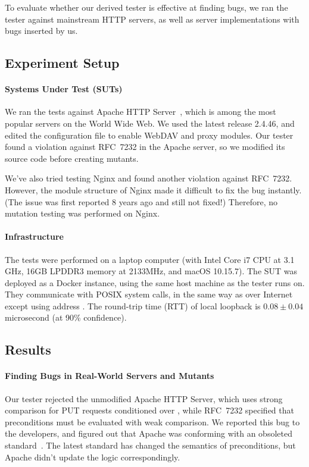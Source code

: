 To evaluate whether our derived tester is effective at finding bugs, we ran the
tester against mainstream HTTP servers, as well as server implementations with
bugs inserted by us.

\subsection{Experiment Setup}
\paragraph*{Systems Under Test (SUTs)}
We ran the tests against Apache HTTP Server~\cite{Apache}, which is among the
most popular servers on the World Wide Web.  We used the latest release 2.4.46,
and edited the configuration file to enable WebDAV and proxy modules.  Our
tester found a violation against RFC~7232 in the Apache server, so we modified
its source code before creating mutants.

We've also tried testing Nginx and found another violation against RFC~7232.
However, the module structure of Nginx made it difficult to fix the bug
instantly.  (The issue was first reported 8 years ago and still not fixed!)
Therefore, no mutation testing was performed on Nginx.

\paragraph*{Infrastructure}
The tests were performed on a laptop computer (with Intel Core i7 CPU at 3.1
GHz, 16GB LPDDR3 memory at 2133MHz, and macOS 10.15.7).  The SUT was deployed
as a Docker instance, using the same host machine as the tester runs on.  They
communicate with POSIX system calls, in the same way as over Internet except
using address .  The round-trip time (RTT) of local loopback
is $0.08\pm0.04$ microsecond (at 90\% confidence).

\subsection{Results}
\label{sec:eval-performance}
\paragraph*{Finding Bugs in Real-World Servers and Mutants}
Our tester rejected the unmodified Apache HTTP Server, which uses strong
comparison for PUT requests conditioned over , while RFC~7232
specified that  preconditions must be evaluated with weak
comparison.  We reported
this bug to the developers, and figured out that Apache was conforming with an
obsoleted \http standard~\cite{rfc2616}.  The latest standard has changed the
semantics of  preconditions, but Apache didn't update the
logic correspondingly.

